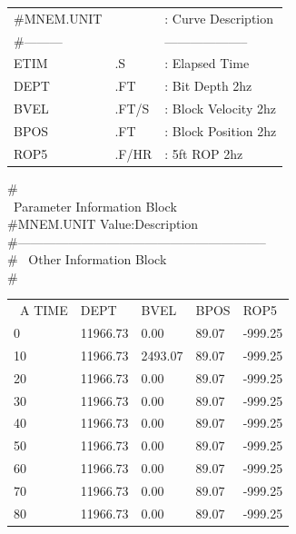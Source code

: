 \documentclass[12pt,a4paper,oneside]{report}
\begin{document}
\begin{appendices}
\begin{mdframed}[backgroundcolor=gray!10]
\begin{table}[H]
\begin{tabu} to 1\textwidth {X[l] X[2,l] X[2,l]}   
$\#$MNEM.UNIT &                    &: Curve Description 	\\
$\#$--------- &                    & --------------------	\\
ETIM &	    	.S	       	  &: Elapsed Time			\\
DEPT &       	.FT               &: Bit Depth 2hz                 \\                                
BVEL &       	.FT/S             &: Block Velocity 2hz            \\                                  
BPOS &       	.FT               &: Block Position 2hz            \\                                  
ROP5 &       	.F/HR             &: 5ft ROP 2hz                  \\                                   

\end{tabu}
\end{table}
                                     
\noindent $\#$\\
~Parameter Information Block \\
$\#$MNEM.UNIT                       Value:Description\\
$\#$-----------------------------------------------------------\\
$\#$
\noindent ~Other Information Block\\ $\#$
\begin{table}[H]
\begin{tabu} to 1\textwidth { X[1.5,l] X[l] X[l] X[l] X[l]}
~A TIME  &      DEPT    &    BVEL  &      BPOS    &    ROP5  \\
0   & 11966.73       & 0.00  &     89.07  &   -999.25   \\ 
10  & 11966.73       & 2493.07  &     89.07  &   -999.25   \\ 
20  & 11966.73       & 0.00  &     89.07  &   -999.25   \\ 
30  & 11966.73       & 0.00  &     89.07  &   -999.25   \\ 
40  & 11966.73       & 0.00  &     89.07  &   -999.25   \\ 
50  & 11966.73       & 0.00  &     89.07  &   -999.25   \\ 
60  & 11966.73       & 0.00  &     89.07  &   -999.25   \\ 
70  & 11966.73       & 0.00    &   89.07    & -999.25   \\ 
80  & 11966.73       & 0.00    &   89.07    & -999.25   
\end{tabu}
\end{table}
\end{mdframed}



\end{appendices}
\end{document}
